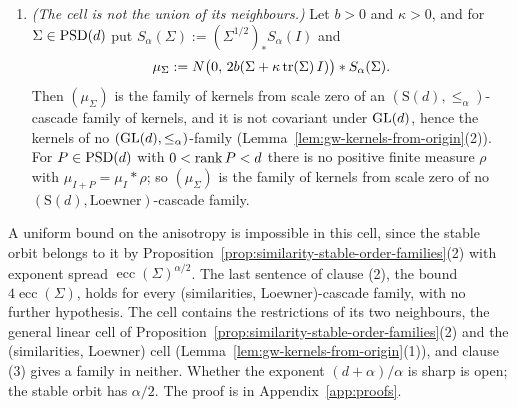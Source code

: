 \begin{proposition}
\begin{enumerate}
$\psi_\Sigma := \psi_{L_\Sigma}$. Then $C(I) = c_0I$ with $c_0 \ge 0$, and
\[
  \varepsilon c_0I \le C(\Sigma) \le tc_0I , \qquad
  (\sqrt\varepsilon\,I)_*L_I \le L_\Sigma \le (\sqrt t\,I)_*L_I , \qquad
  \psi_I(\sqrt\varepsilon\,\omega) \le \psi_\Sigma(\omega) \le \psi_I(\sqrt t\,\omega) .
\]
Consequently $\operatorname{cond}C(\Sigma) \le \operatorname{ecc}(\Sigma)^{(d+\alpha)/\alpha}$ if $c_0 > 0$,
$\operatorname{cond}\mathcal M_s(L_\Sigma) \le \operatorname{ecc}(\Sigma)^{(d+\alpha)/\alpha}$ for every $s > 0$ if
$L_I \ne 0$, and $\operatorname{es}(\psi_\Sigma) \le 4\operatorname{ecc}(\Sigma)^{(d+\alpha)/\alpha}$. For a
$(G, \text{Loewner})$-cascade family of kernels the same holds with $\varepsilon := \lambda_{\min}(\Sigma)$,
$t := \lambda_{\max}(\Sigma)$ and $\operatorname{ecc}(\Sigma)$ in place of
$\operatorname{ecc}(\Sigma)^{(d+\alpha)/\alpha}$.
\item \emph{(The cell is not the union of its neighbours.)} Let $b > 0$ and $\kappa > 0$, and for
$\Sigma \in \mathrm{PSD}(d)$ put $S_\alpha(\Sigma) := (\Sigma^{1/2})_*S_\alpha(I)$ and
\[
  \mu_\Sigma := N\bigl(0,\, 2b(\Sigma + \kappa\operatorname{tr}(\Sigma)\,I)\bigr) * S_\alpha(\Sigma) .
\]
Then $(\mu_\Sigma)$ is the family of kernels from scale zero of an $(\mathrm S(d), \le_\alpha)$-cascade
family of kernels, and it is not covariant under $\mathrm{GL}(d)$, hence the kernels of no
$(\mathrm{GL}(d), \le_\alpha)$-family (Lemma~\ref{lem:gw-kernels-from-origin}(2)). For $P \in \mathrm{PSD}(d)$ with $0 < \operatorname{rank} P < d$ there
is no positive finite measure $\rho$ with $\mu_{I+P} = \mu_I * \rho$; so $(\mu_\Sigma)$ is the family of
kernels from scale zero of no $(\mathrm S(d), \text{Loewner})$-cascade family.
\end{enumerate}
\end{proposition}

A uniform bound on the anisotropy is impossible in this cell, since the stable orbit belongs to it by
Proposition~\ref{prop:similarity-stable-order-families}(2) with exponent spread
$\operatorname{ecc}(\Sigma)^{\alpha/2}$. The last sentence of clause (2), the bound
$4\operatorname{ecc}(\Sigma)$, holds for every (similarities, Loewner)-cascade family, with no further
hypothesis. The cell contains the restrictions of its two neighbours, the general linear cell of
Proposition~\ref{prop:similarity-stable-order-families}(2) and the (similarities, Loewner) cell
(Lemma~\ref{lem:gw-kernels-from-origin}(1)), and clause (3) gives a family in neither. Whether the
exponent $(d+\alpha)/\alpha$ is sharp is open; the stable orbit has $\alpha/2$. The proof is in
Appendix~\ref{app:proofs}.
